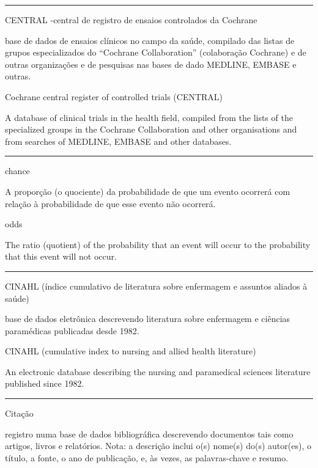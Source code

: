 \documentclass[
  openany]{book}
\begin{document}
\begin{center}\rule{0.5\linewidth}{0.5pt}\end{center}

CENTRAL -central de registro de ensaios controlados da Cochrane

base de dados de ensaios clínicos no campo da saúde, compilado das listas de grupos especializados do ``Cochrane Collaboration'' (colaboração Cochrane) e de outras organizações e de pesquisas nas bases de dado MEDLINE, EMBASE e outras.

Cochrane central register of controlled trials (CENTRAL)

A database of clinical trials in the health field, compiled from the lists of the specialized groups in the Cochrane Collaboration and other organisations and from searches of MEDLINE, EMBASE and other databases.

\begin{center}\rule{0.5\linewidth}{0.5pt}\end{center}

chance

A proporção (o quociente) da probabilidade de que um evento ocorrerá com relação à probabilidade de que esse evento não ocorrerá.

odds

The ratio (quotient) of the probability that an event will occur to the probability that this event will not occur.

\begin{center}\rule{0.5\linewidth}{0.5pt}\end{center}

CINAHL (índice cumulativo de literatura sobre enfermagem e assuntos aliados à saúde)

base de dados eletrônica descrevendo literatura sobre enfermagem e ciências paramédicas publicadas desde 1982.

CINAHL (cumulative index to nursing and allied health literature)

An electronic database describing the nursing and paramedical sciences literature published since 1982.

\begin{center}\rule{0.5\linewidth}{0.5pt}\end{center}

Citação

registro numa base de dados bibliográfica descrevendo documentos tais como artigos, livros e relatórios. Nota: a descrição inclui o(s) nome(s) do(s) autor(es), o título, a fonte, o ano de publicação, e, às vezes, as palavras-chave e resumo.
\end{document}
